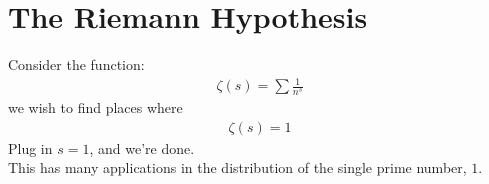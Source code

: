 \setcounter{section}{0}

\section{The Riemann Hypothesis}
Consider the function:
\begin{align*}
  \zeta(s) = \sum \frac{1}{n^s}
\end{align*}
we wish to find places where 
\begin{align*}
  \zeta(s) = 1
\end{align*}
Plug in $s=1$, and we're done.\\

This has many applications in 
the distribution of the single 
prime number, $1$.

